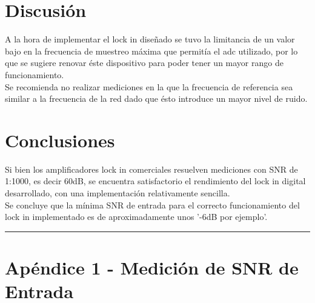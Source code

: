 \documentclass[11pt,a4paper]{extarticle}
\begin{document}
\begin{multicols}{2}
\section{Discusión}
A la hora de implementar el lock in diseñado se tuvo 
la limitancia de un valor bajo en la frecuencia de 
muestreo máxima que permitía el adc utilizado, por lo 
que se sugiere renovar éste 
dispositivo para poder tener un mayor 
rango de funcionamiento.\\

Se recomienda no realizar mediciones 
en la que la frecuencia de referencia sea 
similar a la frecuencia de la red dado que 
ésto introduce un mayor nivel de ruido.


\section{Conclusiones}

Si bien los amplificadores lock in comerciales resuelven 
mediciones con SNR de 1:1000, es decir 60dB,
 se encuentra satisfactorio 
el rendimiento del lock in digital desarrollado, con 
una implementación relativamente sencilla.\\

Se concluye que la mínima SNR de entrada para el 
correcto funcionamiento del lock in implementado es de 
aproximadamente unos '-6dB por ejemplo'.




\end{multicols}
\newpage
\begin{appendices}
\vspace{-1em}
\hrule
\vspace{1em}
\normalsize
\section{Apéndice 1 - Medición de SNR de Entrada}
\end{appendices}
\end{document}
